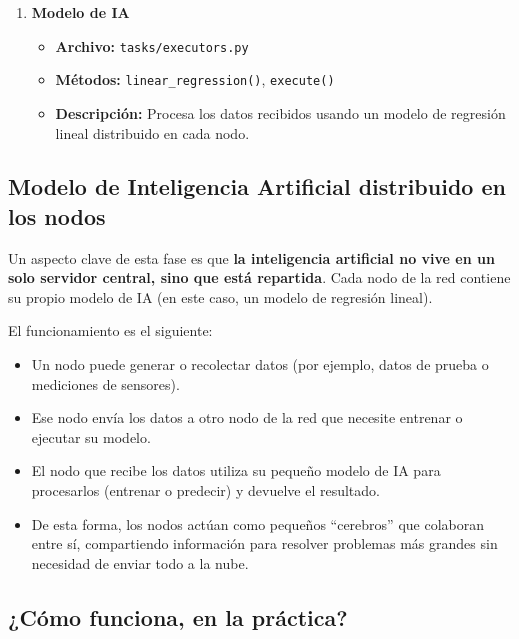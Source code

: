 \documentclass{article}
\begin{document}
\begin{enumerate}
    \item \textbf{Modelo de IA}
    \begin{itemize}
        \item \textbf{Archivo:} \texttt{tasks/executors.py}
        \item \textbf{Métodos:} \texttt{linear\_regression()}, \texttt{execute()}
        \item \textbf{Descripción:} Procesa los datos recibidos usando un modelo de regresión lineal distribuido en cada nodo.
    \end{itemize}
\end{enumerate}

\newpage

\subsection{Modelo de Inteligencia Artificial distribuido en los nodos}

Un aspecto clave de esta fase es que \textbf{la inteligencia artificial no vive en un solo servidor central, sino que está repartida}. Cada nodo de la red contiene su propio modelo de IA (en este caso, un modelo de regresión lineal).

El funcionamiento es el siguiente:
\begin{itemize}
    \item Un nodo puede generar o recolectar datos (por ejemplo, datos de prueba o mediciones de sensores).
    \item Ese nodo envía los datos a otro nodo de la red que necesite entrenar o ejecutar su modelo.
    \item El nodo que recibe los datos utiliza su pequeño modelo de IA para procesarlos (entrenar o predecir) y devuelve el resultado.
    \item De esta forma, los nodos actúan como pequeños ``cerebros'' que colaboran entre sí, compartiendo información para resolver problemas más grandes sin necesidad de enviar todo a la nube.
\end{itemize}

\subsection{¿Cómo funciona, en la práctica?}
\end{document}
